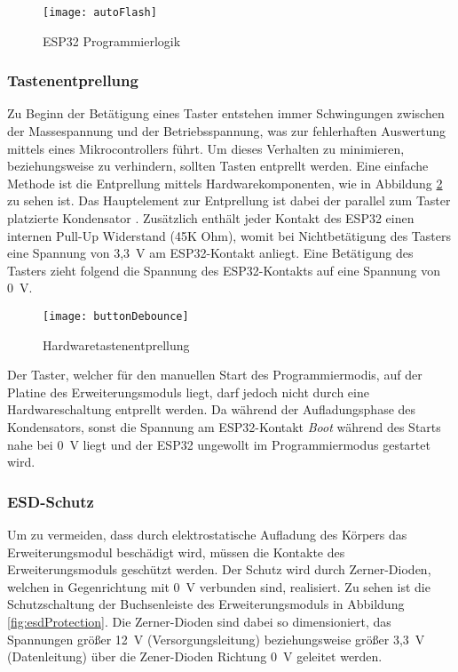 \begin{figure}[h]
    \centering
    \texttt{[image: autoFlash]}
    \caption{ESP32 Programmierlogik}
    \label{fig:autoFlash}
\end{figure}

\subsubsection{Tastenentprellung}
Zu Beginn der Betätigung eines Taster entstehen immer Schwingungen zwischen der Massespannung und der Betriebsspannung, was zur fehlerhaften Auswertung mittels eines Mikrocontrollers führt. Um dieses Verhalten zu minimieren, beziehungsweise zu verhindern, sollten Tasten entprellt werden. Eine einfache Methode ist die Entprellung mittels Hardwarekomponenten, wie in Abbildung \ref{fig:buttonDebounce} zu sehen ist. Das Hauptelement zur Entprellung ist dabei der parallel zum Taster platzierte Kondensator \cite{debounceButton}. Zusätzlich enthält jeder Kontakt des ESP32 einen internen Pull-Up Widerstand (45K Ohm), womit bei Nichtbetätigung des Tasters eine Spannung von 3,3~V am ESP32-Kontakt anliegt. Eine Betätigung des Tasters zieht folgend die Spannung des ESP32-Kontakts auf eine Spannung von 0~V.

\begin{figure}[h]
    \centering
    \texttt{[image: buttonDebounce]}
    \caption{Hardwaretastenentprellung}
    \label{fig:buttonDebounce}
\end{figure}

Der Taster, welcher für den manuellen Start des Programmiermodis, auf der Platine des Erweiterungsmoduls liegt, darf jedoch nicht durch eine Hardwareschaltung entprellt werden. Da während der Aufladungsphase des Kondensators, sonst die Spannung am ESP32-Kontakt \textit{Boot} während des Starts nahe bei 0~V liegt und der ESP32 ungewollt im Programmiermodus gestartet wird.

\subsubsection{\acf{ESD}-Schutz}
\label{section:esdProtection}
Um zu vermeiden, dass durch elektrostatische Aufladung des Körpers das Erweiterungsmodul beschädigt wird, müssen die Kontakte des Erweiterungsmoduls geschützt werden. Der Schutz wird durch Zerner-Dioden, welchen in Gegenrichtung mit 0~V verbunden sind, realisiert. Zu sehen ist die Schutzschaltung der Buchsenleiste des Erweiterungsmoduls in Abbildung \ref{fig:esdProtection}. Die Zerner-Dioden sind dabei so dimensioniert, das Spannungen größer 12~V (Versorgungsleitung) beziehungsweise größer 3,3~V (Datenleitung) über die Zener-Dioden Richtung 0~V geleitet werden.

